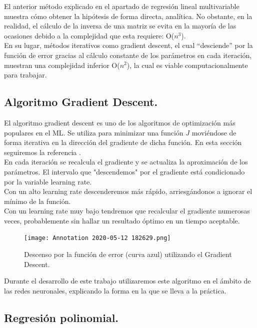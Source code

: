 \documentclass[a4paper,11pt]{article}
\begin{document}
El anterior método explicado en el apartado de regresión lineal multivariable muestra cómo obtener la hipótesis de forma directa, analítica. No obstante, en la realidad, el cálculo de la inversa de una matriz se evita en la mayoría de las ocasiones debido a la complejidad que esta requiere: O($n^3$).\\

\noindent
En su lugar, métodos iterativos como gradient descent, el cual “desciende” por la función de error gracias al cálculo constante de los parámetros en cada iteración, muestran una complejidad inferior O($n^2$), la cual es viable computacionalmente para trabajar. 

\subsection{Algoritmo Gradient Descent.}
El algoritmo gradient descent es uno de los algoritmos de optimización más populares en el ML. Se utiliza para minimizar una función $J$  moviéndose de forma iterativa en la dirección del gradiente de dicha función. En esta sección seguiremos la referencia \cite{granada}.\\

\noindent
En cada iteración se recalcula el gradiente y se actualiza la aproximación de
los parámetros.
El intervalo que "descendemos" \hspace{0.16cm}por el gradiente está condicionado por la variable learning rate. \\

\noindent
Con un alto learning rate descenderemos más rápido, arriesgándonos a ignorar el mínimo de la función.\\ 

\noindent
Con un learning rate muy bajo tendremos que recalcular el gradiente numerosas veces, probablemente sin hallar un resultado óptimo en un tiempo aceptable.
\begin{figure}[H]
\centering
\texttt{[image: Annotation 2020-05-12 182629.png]}
\caption{Descenso por la función de error (curva azul) utilizando el Gradient Descent.}
\end{figure}
\noindent
Durante el desarrollo de este trabajo utilizaremos este algoritmo en el ámbito de las redes neuronales, explicando la forma en la que se lleva a la práctica.

\subsection{Regresión polinomial.}
\end{document}
